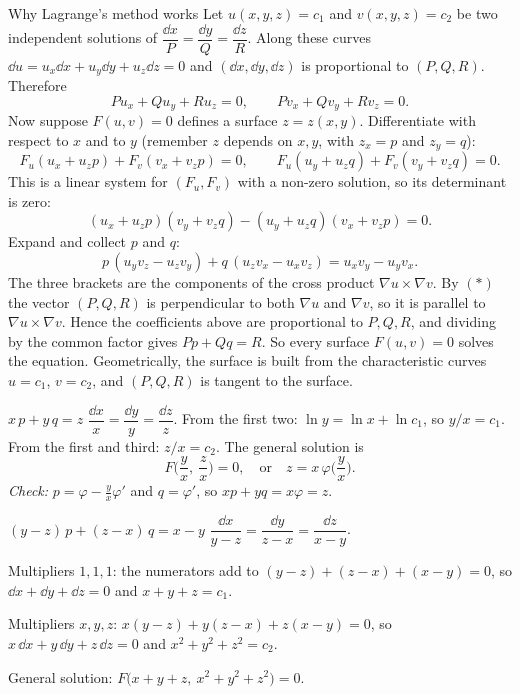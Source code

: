 \begin{derivbox}{Why Lagrange's method works}
Let $u(x,y,z) = c_1$ and $v(x,y,z) = c_2$ be two independent solutions of $\dfrac{\dd x}{P} = \dfrac{\dd y}{Q} = \dfrac{\dd z}{R}$. Along these curves $\dd u = u_x\dd x + u_y\dd y + u_z\dd z = 0$ and $(\dd x,\dd y,\dd z)$ is proportional to $(P,Q,R)$. Therefore
\[ Pu_x + Qu_y + Ru_z = 0,\qquad Pv_x + Qv_y + Rv_z = 0. \tag{$*$} \]
Now suppose $F(u,v) = 0$ defines a surface $z = z(x,y)$. Differentiate with respect to $x$ and to $y$ (remember $z$ depends on $x,y$, with $z_x = p$ and $z_y = q$):
\[ F_u(u_x + u_zp) + F_v(v_x + v_zp) = 0,\qquad F_u(u_y + u_zq) + F_v(v_y + v_zq) = 0. \]
This is a linear system for $(F_u,F_v)$ with a non-zero solution, so its determinant is zero:
\[ (u_x + u_zp)(v_y + v_zq) - (u_y + u_zq)(v_x + v_zp) = 0. \]
Expand and collect $p$ and $q$:
\[ p\,(u_yv_z - u_zv_y) + q\,(u_zv_x - u_xv_z) = u_xv_y - u_yv_x. \]
The three brackets are the components of the cross product $\nabla u\times\nabla v$. By $(*)$ the vector $(P,Q,R)$ is perpendicular to both $\nabla u$ and $\nabla v$, so it is parallel to $\nabla u\times\nabla v$. Hence the coefficients above are proportional to $P,Q,R$, and dividing by the common factor gives $Pp + Qq = R$. So every surface $F(u,v)=0$ solves the equation. Geometrically, the surface is built from the characteristic curves $u = c_1$, $v = c_2$, and $(P,Q,R)$ is tangent to the surface.
\end{derivbox}

\begin{examplebox}{$x\,p + y\,q = z$}
$\dfrac{\dd x}{x} = \dfrac{\dd y}{y} = \dfrac{\dd z}{z}$. From the first two: $\ln y = \ln x + \ln c_1$, so $y/x = c_1$. From the first and third: $z/x = c_2$. The general solution is
\[ F\Big(\frac yx,\ \frac zx\Big) = 0, \quad\text{or}\quad z = x\,\varphi\Big(\frac yx\Big). \]
\textit{Check:} $p = \varphi - \frac yx\varphi'$ and $q = \varphi'$, so $xp + yq = x\varphi = z$. \checkmark
\end{examplebox}

\begin{examplebox}{$(y-z)\,p + (z-x)\,q = x-y$}
$\dfrac{\dd x}{y-z} = \dfrac{\dd y}{z-x} = \dfrac{\dd z}{x-y}$.

Multipliers $1,1,1$: the numerators add to $(y-z)+(z-x)+(x-y)=0$, so $\dd x + \dd y + \dd z = 0$ and $x+y+z = c_1$.

Multipliers $x,y,z$: $x(y-z) + y(z-x) + z(x-y) = 0$, so $x\,\dd x + y\,\dd y + z\,\dd z=0$ and $x^2+y^2+z^2 = c_2$.

General solution: $F\big(x+y+z,\ x^2+y^2+z^2\big) = 0$.
\end{examplebox}

